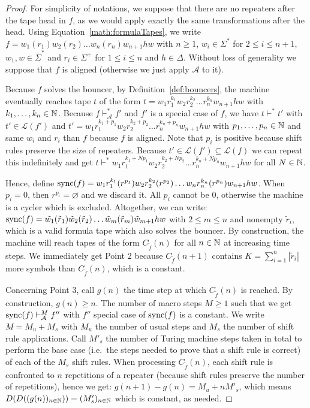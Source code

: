 \begin{proof}
    For simplicity of notations, we suppose that there are no repeaters after the tape head in $f$, as we would apply exactly the same transformations after the head. Using Equation~\eqref{math:formulaTapes}, we write $f=w_1(r_1)w_2(r_2)\dots w_n(r_n) w_{n+1} h w$ with $n \geq 1$, $w_i \in \Sigma^*$ for $2 \leq i \leq n+1$, $w_1,w \in \overline{\Sigma}^*$ and $r_i \in \Sigma^+$ for $1 \leq i \leq n$ and $h\in\Delta$. Without loss of generality we suppose that $f$ is aligned (otherwise we just apply $\mathcal{A}$ to it).

    Because $f$ solves the bouncer, by Definition~\ref{def:bouncers}, the machine eventually reaches tape $t$ of the form $t = w_1 r_1^{k_1} w_2 r_2^{k_2} \dots r_n^{k_n} w_{n+1} h w$ with $k_1, \dots, k_n \in \mathbb{N}$. Because $f \vdash_\mathcal{A}^* f'$ and $f'$ is a special case of $f$, we have $t \vdash^* t'$ with $t' \in \mathcal{L}(f')$ and $t' = w_1 r_1^{k_1 + p_1} w_2 r_2^{k_2 + p_2} \dots r_n^{k_n + p_n} w_{n+1} h w$ with $p_1, \dots, p_n \in \mathbb{N}$ and same $w_i$ and $r_i$ than $f$ because $f$ is aligned. Note that $p_i$ is positive because shift rules preserve the size of repeaters. Because $t'\in\mathcal{L}(f') \subseteq \mathcal{L}(f)$ we can repeat this indefinitely and get $t \vdash^* w_1 r_1^{k_1 + Np_1} w_2 r_2^{k_2 + Np_2} \dots r_n^{k_n + Np_n} w_{n+1} h w$ for all $N \in \mathbb{N}$.

    Hence, define $\operatorname{sync}(f) = w_1 r_1^{k_1} (r^{p_1}) w_2 r_2^{k_2} (r^{p_2}) \dots w_n r_n^{k_n} (r^{p_n}) w_{n+1} h w$. When $p_i=0$, then $r^{p_i} = \varnothing$ and we discard it. All $p_i$ cannot be $0$, otherwise the machine is a cycler which is excluded. Altogether, we can write: $\operatorname{sync}(f) = \tilde{w_1} (\tilde{r}_1) \tilde{w}_2 (\tilde{r}_2) \dots \tilde{w}_m (\tilde{r}_m) \tilde{w}_{m+1} h w$ with $2 \leq m \leq n$ and nonempty $\tilde{r}_i$, which is a valid formula tape which also solves the bouncer. By construction, the machine will reach tapes of the form $C_{\tilde{f}}(n)$ for all $n\in\mathbb{N}$ at increasing time steps. We immediately get Point 2 because $C_{\tilde{f}}(n+1)$ contains $K = \sum_{i=1}^n |\tilde{r}_i|$ more symbols than $C_{\tilde{f}}(n)$, which is a constant.

    Concerning Point 3, call $g(n)$ the time step at which $C_{\tilde{f}}(n)$ is reached. By construction, $g(n) \geq n$. The number of macro steps $M \geq 1$ such that we get $\operatorname{sync}(f) \vdash_\mathcal{A}^M f''$ with $f''$ special case of $\operatorname{sync}(f)$ is a constant. We write $M = M_u + M_s$ with $ M_u$ the number of usual steps and $M_s$ the number of shift rule applications. Call $M'_s$ the number of Turing machine steps taken in total to perform the base case (i.e.\ the steps needed to prove that a shift rule is correct) of each of the $M_s$ shift rules. When processing $C_{\tilde{f}}(n)$, each shift rule is confronted to $n$ repetitions of a repeater (because shift rules preserve the number of repetitions), hence we get: $g(n+1) - g(n) = M_u + n M'_s$, which means $D(D((g(n))_{n\in\mathbb{N}})) = (M'_s)_{n\in\mathbb{N}}$ which is constant, as needed.

\end{proof}

